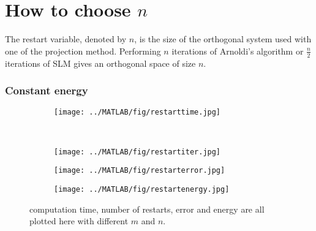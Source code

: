 \section{How to choose $n$}%
The restart variable, denoted by $n$, is the size of the orthogonal system used with one of the projection method. Performing $n$ iterations of Arnoldi's algorithm or $\frac{n}{2}$ iterations of SLM gives an orthogonal space of size $n$.

\subsubsection{Constant energy}
\begin{figure}[H]
        \centering
        \begin{subfigure}[b]{0.45\textwidth}
                \texttt{[image: ../MATLAB/fig/restarttime.jpg]}
                \caption{  }
                \label{fig:restarttime}
        \end{subfigure}
        ~
        \begin{subfigure}[b]{0.45\textwidth}
                \texttt{[image: ../MATLAB/fig/restartiter.jpg]}
                \caption{  }
                \label{fig:restartiter}
        \end{subfigure}
        \begin{subfigure}[b]{0.45\textwidth}
                \texttt{[image: ../MATLAB/fig/restarterror.jpg]}
                \caption{  }
                \label{fig:restarterror}
        \end{subfigure}
        \begin{subfigure}[b]{0.45\textwidth}
                \texttt{[image: ../MATLAB/fig/restartenergy.jpg]}
                \caption{  }
                \label{fig:restartenergy}
        \end{subfigure}
        \caption{ computation time, number of restarts, error and energy are all plotted here with different $m$ and $n$. }
        \label{fig:restart}
\end{figure}

